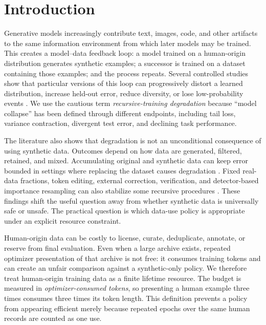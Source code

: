 \section{Introduction}
\label{sec:intro}

Generative models increasingly contribute text, images, code, and other artifacts to the same information environment from which later models may be trained. This creates a model--data feedback loop: a model trained on a human-origin distribution generates synthetic examples; a successor is trained on a dataset containing those examples; and the process repeats. Several controlled studies show that particular versions of this loop can progressively distort a learned distribution, increase held-out error, reduce diversity, or lose low-probability events \cite{shumailov2024collapse,alemohammad2024mad,briesch2023llmoutput,dohmatob2024tails,dohmatob2024regression,suresh2025rate}. We use the cautious term \emph{recursive-training degradation} because ``model collapse'' has been defined through different endpoints, including tail loss, variance contraction, divergent test error, and declining task performance.

The literature also shows that degradation is not an unconditional consequence of using synthetic data. Outcomes depend on how data are generated, filtered, retained, and mixed. Accumulating original and synthetic data can keep error bounded in settings where replacing the dataset causes degradation \cite{gerstgrasser2024inevitable,kazdan2025collapse}. Fixed real-data fractions, token editing, external correction, verification, and detector-based importance resampling can also stabilize some recursive procedures \cite{seddik2024synthetic,gillman2024selfcorrecting,drayson2025machine,zhu2025synthesize,zhu2026reflow,yi2026verification}. These findings shift the useful question away from whether synthetic data is universally safe or unsafe. The practical question is which data-use policy is appropriate under an explicit resource constraint.

Human-origin data can be costly to license, curate, deduplicate, annotate, or reserve from final evaluation. Even when a large archive exists, repeated optimizer presentation of that archive is not free: it consumes training tokens and can create an unfair comparison against a synthetic-only policy. We therefore treat human-origin training data as a finite lifetime resource. The budget is measured in \emph{optimizer-consumed tokens}, so presenting a human example three times consumes three times its token length. This definition prevents a policy from appearing efficient merely because repeated epochs over the same human records are counted as one use.

